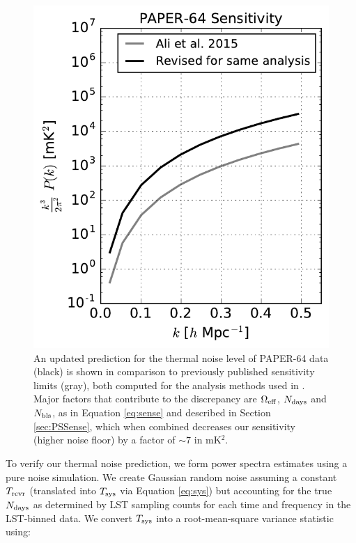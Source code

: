 \documentclass[preprint2,numberedappendix,tighten]{aastex6}  %
\begin{document}
\begin{figure}
	\centering
	\includegraphics[width=\columnwidth]{plots/sense_check.pdf}
	\caption{An updated prediction for the thermal noise level of PAPER-64 data (black) is shown in comparison to previously 
published sensitivity limits (gray), both computed for the analysis methods used in . Major factors that contribute to the discrepancy are $
\Omega_{\rm eff}$, $N_{\rm days}$ and $N_{\rm bls}$, as in Equation \eqref{eq:sense} and described in Section \ref{sec:PSSense}, which when combined decreases our 
sensitivity (higher noise floor) by a factor of $\sim7$ in mK$^{2}$.}
	\label{fig:sense_check}
\end{figure}

To verify our thermal noise prediction, we form power spectra estimates using a pure noise simulation. We create Gaussian 
random noise assuming a constant $T_{\rm rcvr}$ (translated into $T_{\rm sys}$ via Equation \eqref{eq:sys}) but accounting for the true $N_{\rm days}$ as determined 
by LST sampling counts for each time and frequency in the LST-binned data. We convert $T_{\rm sys}$ into a root-mean-square variance statistic 
using:
\end{document}
